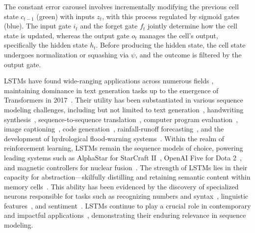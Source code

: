 The constant error carousel involves incrementally modifying the previous cell state $c_{t-1}$ (green) with inputs $z_t$, with this process regulated by sigmoid gates (blue). The input gate $i_t$ and the forget gate $f_t$ jointly determine how the cell state is updated, whereas the output gate $o_t$ manages the cell’s output, specifically the hidden state $h_t$. Before producing the hidden state, the cell state undergoes normalization or squashing via $\psi$, and the outcome is filtered by the output gate.

LSTMs have found wide-ranging applications across numerous fields \citep{Hochreiter:01,Hochreiter:07,Schmidhuber:15}, maintaining dominance in text generation tasks up to the emergence of Transformers in 2017~\citep{Vaswani:17}. Their utility has been substantiated in various sequence modeling challenges, including but not limited to text generation~\citep{Graves:13,Karpathy:15blog}, handwriting synthesis~\citep{Graves:13}, sequence-to-sequence translation~\citep{Sutskever:14nips}, computer program evaluation~\citep{Zaremba:14arxiv}, image captioning~\citep{Karpathy:15,Hossain:19}, code generation~\citep{Karpathy:15blog}, rainfall-runoff forecasting~\citep{Kratzert:18,Kratzert:19}, and the development of hydrological flood-warning systems~\citep{Nearing:24}. Within the realm of reinforcement learning, LSTMs remain the sequence models of choice, powering leading systems such as AlphaStar for StarCraft II~\citep{Vinyals:17short}, OpenAI Five for Dota 2~\citep{OpenAI:19}, and magnetic controllers for nuclear fusion~\citep{Degrave:22short}. The strength of LSTMs lies in their capacity for abstraction—skilfully distilling and retaining semantic content within memory cells~\citep{Karpathy:15blog}. This ability has been evidenced by the discovery of specialized neurons responsible for tasks such as recognizing numbers and syntax~\citep{Lakretz:19}, linguistic features~\citep{Bau:19}, and sentiment~\citep{Radford:17arxiv}. LSTMs continue to play a crucial role in contemporary and impactful applications~\citep{Degrave:22short,Nearing:24}, demonstrating their enduring relevance in sequence modeling.

